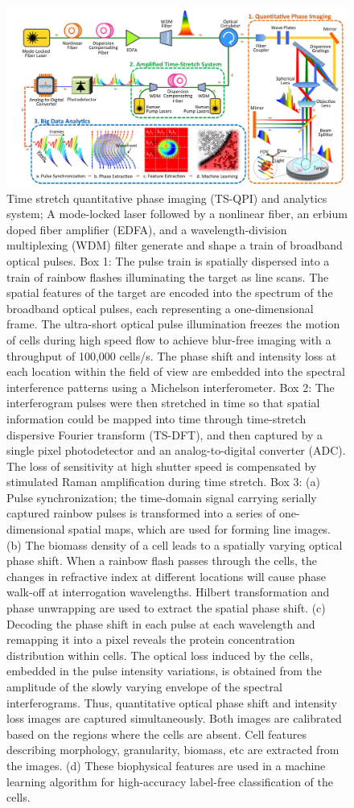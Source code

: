 \documentclass[aps,pra,reprint,longbibliography,superscriptaddress]{revtex4-1}
\begin{document}
\begin{figure}
\includegraphics[scale=0.2]{FigureSetup.jpg}
\caption{\label{fig:Setup} Time stretch quantitative phase imaging (TS-QPI) and analytics system; A mode-locked laser followed by a nonlinear fiber, an erbium doped fiber amplifier (EDFA), and a wavelength-division multiplexing (WDM) filter generate and shape a train of broadband optical pulses. Box 1: The pulse train is spatially dispersed into a train of rainbow flashes illuminating the target as line scans. The spatial features of the target are encoded into the spectrum of the broadband optical pulses, each representing a one-dimensional frame. The ultra-short optical pulse illumination freezes the motion of cells during high speed flow to achieve blur-free imaging with a throughput of 100,000 cells/s. The phase shift and intensity loss at each location within the field of view are embedded into the spectral interference patterns using a Michelson interferometer. Box 2: The interferogram pulses were then stretched in time so that spatial information could be mapped into time through time-stretch dispersive Fourier transform (TS-DFT), and then captured by a single pixel photodetector and an analog-to-digital converter (ADC). The loss of sensitivity at high shutter speed is compensated by stimulated Raman amplification during time stretch. Box 3: (a) Pulse synchronization; the time-domain signal carrying serially captured rainbow pulses is transformed into a series of one-dimensional spatial maps, which are used for forming line images. (b) The biomass density of a cell leads to a spatially varying optical phase shift. When a rainbow flash passes through the cells, the changes in refractive index at different locations will cause phase walk-off at interrogation wavelengths. Hilbert transformation and phase unwrapping are used to extract the spatial phase shift. (c) Decoding the phase shift in each pulse at each wavelength and remapping it into a pixel reveals the protein concentration distribution within cells. The optical loss induced by the cells, embedded in the pulse intensity variations, is obtained from the amplitude of the slowly varying envelope of the spectral interferograms. Thus, quantitative optical phase shift and intensity loss images are captured simultaneously. Both images are calibrated based on the regions where the cells are absent. Cell features describing morphology, granularity, biomass, etc are extracted from the images. (d) These biophysical features are used in a machine learning algorithm for high-accuracy label-free classification of the cells.}
\end{figure}
\end{document}
